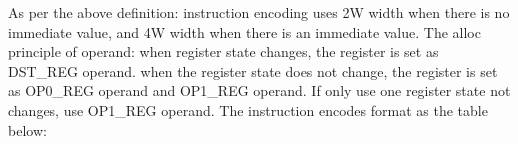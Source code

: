 As per the above definition: instruction encoding uses 2W width when there is no immediate value, and 4W width when there is an immediate value.
The alloc principle of operand: when register state changes, the register is set as DST\_REG operand.
when the register state does not change, the register is set as OP0\_REG operand and OP1\_REG operand.
If only use one register state not changes, use OP1\_REG operand.
The instruction encodes format as the table below:

\begin{table}[!ht]
    \centering {}
    \caption{OlaVM instruction encode format}
    \label{table: processor_instruction_decode}
\end{table}

